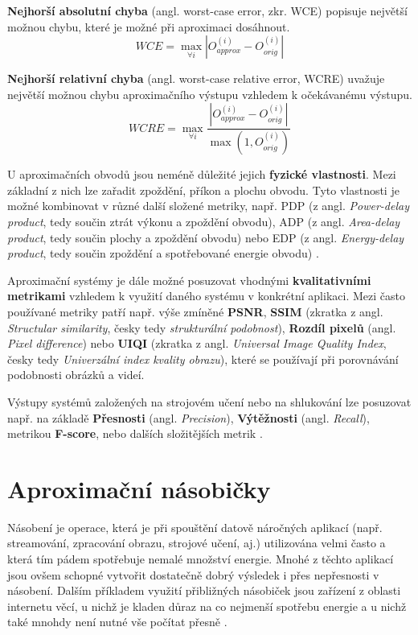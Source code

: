 \textbf{Nejhorší absolutní chyba} (angl. worst-case error, zkr. WCE) popisuje největší možnou chybu, které je možné při aproximaci dosáhnout.
\begin{equation}
    WCE = \max_{\forall i} \left|{O_{approx}^{(i)} - O_{orig}^{(i)}}\right|
\end{equation}

\textbf{Nejhorší relativní chyba} (angl. worst-case relative error, WCRE) uvažuje největší možnou chybu aproximačního výstupu vzhledem k očekávanému výstupu.
\begin{equation}
    WCRE = \max_{\forall i} \frac{\left|{O_{approx}^{(i)} - O_{orig}^{(i)}}\right|} {\max(1,O_{orig}^{(i)})} 
\end{equation}

\bigskip

U aproximačních obvodů jsou neméně důležité jejich \textbf{fyzické vlastnosti}. Mezi základní z nich lze zařadit zpoždění, příkon a plochu obvodu. Tyto vlastnosti je možné kombinovat v různé další složené metriky, např. PDP (z angl. \textit{Power-delay product}, tedy součin ztrát výkonu a zpoždění obvodu), ADP (z angl. \textit{Area-delay product}, tedy součin plochy a zpoždění obvodu) nebo EDP (z angl. \textit{Energy-delay product}, tedy součin zpoždění a spotřebované energie obvodu) \cite{approx_arith_circuits}.

\bigskip

Aproximační systémy je dále možné posuzovat vhodnými \textbf{kvalitativními metrikami} vzhledem k využití daného systému v konkrétní aplikaci. Mezi často používané metriky \cite{ac_techniques} patří např. výše zmíněné \textbf{PSNR}, \textbf{SSIM} (zkratka z angl. \textit{Structular similarity}, česky tedy \textit{strukturální podobnost}), \textbf{Rozdíl pixelů} (angl. \textit{Pixel difference}) nebo \textbf{UIQI} (zkratka z angl. \textit{Universal Image Quality Index}, česky tedy \textit{Univerzální index kvality obrazu}), které se používají při porovnávání podobnosti obrázků a videí.

Výstupy systémů založených na strojovém učení nebo na shlukování lze posuzovat např. na základě \textbf{Přesnosti} (angl. \textit{Precision}), \textbf{Výtěžnosti} (angl. \textit{Recall}), metrikou \textbf{F-score}, nebo dalších složitějších metrik \cite{clustering_eval}.

\section{Aproximační násobičky} \label{approx_mult}
Násobení je operace, která je při spouštění datově náročných aplikací (např. streamování, zpracování obrazu, strojové učení, aj.) utilizována velmi často a která tím pádem spotřebuje nemalé množství energie. Mnohé z těchto aplikací jsou ovšem schopné vytvořit dostatečně dobrý výsledek i přes nepřesnosti v násobení. Dalším příkladem využití přibližných násobiček jsou zařízení z oblasti internetu věcí, u nichž je kladen důraz na co nejmenší spotřebu energie a u nichž také mnohdy není nutné vše počítat přesně \cite{approx_mult_survey}.

